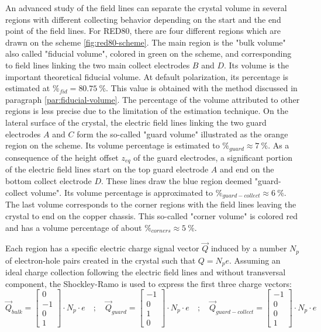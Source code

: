 An advanced study of the field lines can separate the crystal volume in several regions with different collecting behavior depending on the start and the end point of the field lines. For RED80, there are four different regions which are drawn on the scheme \ref{fig:red80-scheme}. 
The main region is the "bulk volume" also called "fiducial volume", colored in green on the scheme, and corresponding to field lines linking the two main collect electrodes $B$ and $D$. Its volume is the important theoretical fiducial volume. At default polarization, its percentage is estimated at $\%_{fid}=\SI{80.75}{\percent}$. This value is obtained with the method discussed in paragraph \ref{par:fiducial-volume}. The percentage of the volume attributed to other regions is less precise due to the limitation of the estimation technique.
On the lateral surface of the crystal, the electric field lines linking the two guard electrodes $A$ and $C$ form the so-called "guard volume" illustrated as the orange region on the scheme. Its volume percentage is estimated to $\%_{guard} \approx \SI{7}{\percent}$. 
As a consequence of the height offset $z_{eq}$ of the guard electrodes, a significant portion of the electric field lines start on the top guard electrode $A$ and end on the bottom collect electrode $D$. These lines draw the blue region deemed "guard-collect volume". Its volume percentage is approximated to $\%_{guard-collect} \approx \SI{6}{\percent}$.
The last volume corresponds to the corner regions with the field lines leaving the crystal to end on the copper chassis. This so-called "corner volume" is colored red and has a volume percentage of about $\%_{corners} \approx \SI{5}{\percent}$.

Each region has a specific electric charge signal vector $\vec{Q}$ induced by a number $N_p$ of electron-hole pairs created in the crystal such that $Q = N_p e$. Assuming an ideal charge collection following the electric field lines and without transversal component, the Shockley-Ramo is used to express the first three charge vectors:
\begin{equation}
\label{eq:red80-induced-charges}
\vec{Q}_{bulk} =
\begin{bmatrix}
0 \\ -1 \\ 0 \\ 1
\end{bmatrix}
\cdot N_p \cdot e
\quad ; \quad
\vec{Q}_{guard} =
\begin{bmatrix}
-1 \\ 0 \\ 1 \\ 0
\end{bmatrix}
\cdot N_p \cdot e
\quad ; \quad
\vec{Q}_{guard-collect} =
\begin{bmatrix}
-1 \\ 0 \\ 0 \\ 1
\end{bmatrix}
\cdot N_p \cdot e
\end{equation}

